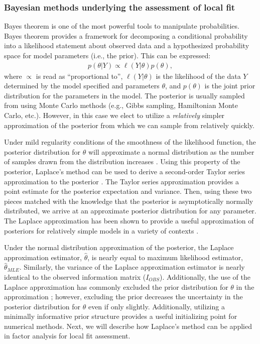 \documentclass[man, noextraspace, floatsintext, 12pt]{apa7}
\begin{document}
\subsubsection{Bayesian methods underlying the assessment of local fit}

Bayes theorem is one of the most powerful tools to manipulate probabilities. 
Bayes theorem provides a framework for decomposing a conditional probability into a likelihood statement about observed data and a hypothesized probability space for model parameters (i.e., the prior).
This can be expressed:
\begin{align*}
p(\theta \vert Y) \propto \ell (Y \vert \theta)p(\theta),
\end{align*}
where $\propto$ is read as ``proportional to'', $\ell (Y \vert \theta)$ is the likelihood of the data $Y$ determined by the model specified and parameters $\theta$, and $p(\theta)$ is the joint prior distribution for the parameters in the model.
The posterior is usually sampled from using Monte Carlo methods (e.g., Gibbs sampling, Hamiltonian Monte Carlo, etc.).
However, in this case we elect to utilize a \textit{relatively} simpler approximation of the posterior from which we can sample from relatively quickly.

Under mild regularity conditions of the smoothness of the likelihood function, the posterior distribution for $\theta$ will approximate a normal distribution as the number of samples drawn from the distribution increases \citep{DBA3}.
Using this property of the posterior, Laplace's method can be used to derive a second-order Taylor series approximation to the posterior \citep{Tierney1986}.
The Taylor series approximation provides a point estimate for the posterior expectation and variance.
Then, using these two pieces matched with the knowledge that the posterior is asymptotically normally distributed, we arrive at an approximate posterior distribution for any parameter. 
The Laplace approximation has been shown to provide a useful approximation of posteriors for relatively simple models in a variety of contexts \citep{Kass1989, Rue2009}.

Under the normal distribution approximation of the posterior, the Laplace approximation estimator, $\hat{\theta}$, is nearly equal to maximum likelihood estimator, $\hat{\theta}_{MLE}$. 
Similarly, the variance of the Laplace approximation estimator is nearly identical to the observed information matrix ($I_{OBS}$). %
Additionally, the use of the Laplace approximation has commonly excluded the prior distribution for $\theta$ in the approximation \citep{Lee2016, Rue2009, Wolfinger1993, Li1992}; however, excluding the prior decreases the uncertainty in the posterior distribution for $\theta$ even if only slightly.
Additionally, utilizing a minimally informative prior structure provides a useful initializing point for numerical methods.
Next, we will describe how Laplace's method can be applied in factor analysis for local fit assessment.
\end{document}

